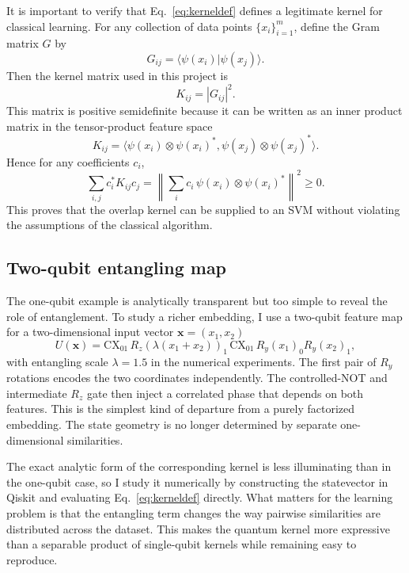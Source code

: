 \documentclass[11pt]{article}
\begin{document}
It is important to verify that Eq.~\eqref{eq:kerneldef} defines a legitimate kernel for classical learning. For any collection of data points $\{x_i\}_{i=1}^m$, define the Gram matrix $G$ by
\begin{equation}
G_{ij} = \langle \psi(x_i)|\psi(x_j)\rangle.
\label{eq:gram}
\end{equation}
Then the kernel matrix used in this project is
\begin{equation}
K_{ij}=|G_{ij}|^2.
\label{eq:kernelgram}
\end{equation}
This matrix is positive semidefinite because it can be written as an inner product matrix in the tensor-product feature space
\begin{equation}
K_{ij}
=
\langle \psi(x_i)\otimes \psi(x_i)^* , \psi(x_j)\otimes \psi(x_j)^* \rangle.
\label{eq:tensorpsd}
\end{equation}
Hence for any coefficients $c_i$,
\begin{equation}
\sum_{i,j} c_i^* K_{ij} c_j
=
\left\| \sum_i c_i \, \psi(x_i)\otimes \psi(x_i)^* \right\|^2 \ge 0.
\label{eq:psdproof}
\end{equation}
This proves that the overlap kernel can be supplied to an SVM without violating the assumptions of the classical algorithm.

\subsection{Two-qubit entangling map}

The one-qubit example is analytically transparent but too simple to reveal the role of entanglement. To study a richer embedding, I use a two-qubit feature map for a two-dimensional input vector $\bm{x}=(x_1,x_2)$
\begin{equation}
U(\bm{x})
=
\mathrm{CX}_{01}\,
R_z\!\left(\lambda(x_1+x_2)\right)_1\,
\mathrm{CX}_{01}\,
R_y(x_1)_0 R_y(x_2)_1,
\label{eq:twoqubitmap}
\end{equation}
with entangling scale $\lambda = 1.5$ in the numerical experiments. The first pair of $R_y$ rotations encodes the two coordinates independently. The controlled-NOT and intermediate $R_z$ gate then inject a correlated phase that depends on both features. This is the simplest kind of departure from a purely factorized embedding. The state geometry is no longer determined by separate one-dimensional similarities.

The exact analytic form of the corresponding kernel is less illuminating than in the one-qubit case, so I study it numerically by constructing the statevector in Qiskit and evaluating Eq.~\eqref{eq:kerneldef} directly. What matters for the learning problem is that the entangling term changes the way pairwise similarities are distributed across the dataset. This makes the quantum kernel more expressive than a separable product of single-qubit kernels while remaining easy to reproduce.
\end{document}
